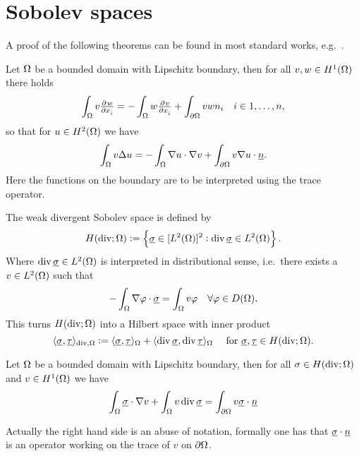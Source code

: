 \documentclass[thesis.tex]{subfiles}
\begin{document}
\section{Sobolev spaces}
A proof of the following theorems can be found in most standard works, e.g.~\cite{gaticasimple}.
\begin{thm}
  \label{thm:green}
  Let $\Omega$ be a bounded domain with Lipschitz boundary, then for all $v,w \in H^1(\Omega)$  there holds
  \[
    \int_{\O} v \pd{w}{x_i} = - \int_{\O} w \pd{v}{x_i} +   \int_{\partial \O} vw n_i \quad i \in {1,\dots, n},
  \]
  so that for  $u \in H^2(\Omega)$ we have
  \[
    \int_{\Omega} v\Delta u = - \int_{\Omega} \nabla u \cdot \nabla v + \int_{\partial \Omega} v \nabla u \cdot \underline{n}.
  \]
  Here the functions on the boundary are to be interpreted using the trace operator.
\end{thm}
\begin{defn}
  \label{def:hdiv}
The weak divergent Sobolev space is defined by
\[
  H(\operatorname{div}; \Omega) := \set{ \underline{\sigma} \in [L^2(\Omega)]^2 : \operatorname{div}\underline{\sigma} \in L^2(\Omega)}.
  \]
  Where $\operatorname{div} \underline{\sigma} \in L^2(\Omega)$ is interpreted in distributional sense, i.e.~there exists a $v\in L^2(\Omega)$ such that
  \[
    - \int_{\Omega} \nabla \varphi \cdot \underline{\sigma} = \int_{\Omega} v\varphi\quad \forall \varphi \in D(\Omega).
  \]
  This turns $H(\operatorname{div}; \Omega)$ into a Hilbert space with inner product
  \[
    \langle \underline{\sigma}, \underline{\tau} \rangle_{\operatorname{div},\Omega} :=  \langle \underline{\sigma}, \underline{\tau} \rangle_{\Omega} + \langle \operatorname{div} \underline{\sigma}, \operatorname{div} \underline{\tau} \rangle_{\Omega}\quad \text{ for } \underline{\sigma}, \underline{\tau} \in H(\operatorname{div}; \Omega).
  \]
\end{defn}
\begin{thm}
  \label{thm:divergence}
  Let $\Omega$ be a bounded domain with Lipschitz boundary, then for all $\sigma \in H(\operatorname{div}; \Omega)$ and $v \in H^1(\Omega)$ we  have
  \[
    \int_\Omega \underline{\sigma} \cdot \nabla v + \int_\Omega  v \operatorname{div} \underline{\sigma} = \int_{\partial \Omega} v \underline{\sigma}\cdot \underline{n}
  \]
\end{thm}
Actually the right hand side is an abuse of notation, formally one has that $\underline{\sigma}\cdot\underline{n}$ is an operator working on the
trace of $v$ on $\partial \Omega$. 
\end{document}
